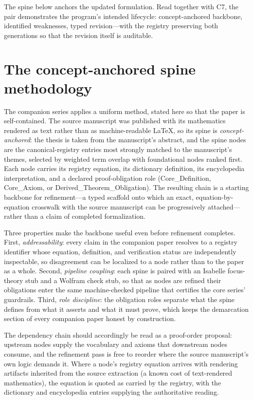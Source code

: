 \documentclass[11pt]{article}
\theoremstyle{remark}
\begin{document}
The spine below anchors the updated formulation. Read together with C7, the pair demonstrates the program's intended lifecycle: concept-anchored backbone, identified weaknesses, typed revision---with the registry preserving both generations so that the revision itself is auditable.

\section{The concept-anchored spine methodology}
\label{sec:method}

The companion series applies a uniform method, stated here so that the paper is self-contained. The source manuscript was published with its mathematics rendered as text rather than as machine-readable LaTeX, so its spine is \emph{concept-anchored}: the thesis is taken from the manuscript's abstract, and the spine nodes are the canonical-registry entries most strongly matched to the manuscript's themes, selected by weighted term overlap with foundational nodes ranked first. Each node carries its registry equation, its dictionary definition, its encyclopedia interpretation, and a declared proof-obligation role (Core\_Definition, Core\_Axiom, or Derived\_Theorem\_Obligation). The resulting chain is a starting backbone for refinement---a typed scaffold onto which an exact, equation-by-equation crosswalk with the source manuscript can be progressively attached---rather than a claim of completed formalization.

Three properties make the backbone useful even before refinement completes. First, \emph{addressability}: every claim in the companion paper resolves to a registry identifier whose equation, definition, and verification status are independently inspectable, so disagreement can be localized to a node rather than to the paper as a whole. Second, \emph{pipeline coupling}: each spine is paired with an Isabelle focus-theory stub and a Wolfram check stub, so that as nodes are refined their obligations enter the same machine-checked pipeline that certifies the core series' guardrails. Third, \emph{role discipline}: the obligation roles separate what the spine defines from what it asserts and what it must prove, which keeps the demarcation section of every companion paper honest by construction.

The dependency chain should accordingly be read as a proof-order proposal: upstream nodes supply the vocabulary and axioms that downstream nodes consume, and the refinement pass is free to reorder where the source manuscript's own logic demands it. Where a node's registry equation arrives with rendering artifacts inherited from the source extraction (a known cost of text-rendered mathematics), the equation is quoted as carried by the registry, with the dictionary and encyclopedia entries supplying the authoritative reading.
\end{document}
